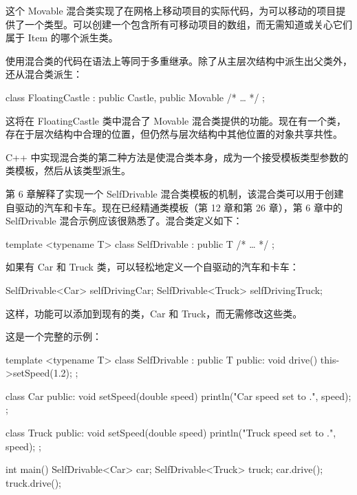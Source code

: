 这个 Movable 混合类实现了在网格上移动项目的实际代码，为可以移动的项目提供了一个类型。可以创建一个包含所有可移动项目的数组，而无需知道或关心它们属于 Item 的哪个派生类。


使用混合类的代码在语法上等同于多重继承。除了从主层次结构中派生出父类外，还从混合类派生：

\begin{cpp}
class FloatingCastle : public Castle, public Movable { /* … */ };
\end{cpp}

这将在 FloatingCastle 类中混合了 Movable 混合类提供的功能。现在有一个类，存在于层次结构中合理的位置，但仍然与层次结构中其他位置的对象共享共性。


C++ 中实现混合类的第二种方法是使混合类本身，成为一个接受模板类型参数的类模板，然后从该类型派生。

第 6 章解释了实现一个 SelfDrivable 混合类模板的机制，该混合类可以用于创建自驱动的汽车和卡车。现在已经精通类模板（第 12 章和第 26 章），第 6 章中的 SelfDrivable 混合示例应该很熟悉了。混合类定义如下：

\begin{cpp}
template <typename T>
class SelfDrivable : public T { /* … */ };
\end{cpp}

如果有 Car 和 Truck 类，可以轻松地定义一个自驱动的汽车和卡车：

\begin{cpp}
SelfDrivable<Car> selfDrivingCar;
SelfDrivable<Truck> selfDrivingTruck;
\end{cpp}

这样，功能可以添加到现有的类，Car 和 Truck，而无需修改这些类。

这是一个完整的示例：

\begin{cpp}
template <typename T>
class SelfDrivable : public T
{
    public:
        void drive() { this->setSpeed(1.2); }
};

class Car
{
    public:
        void setSpeed(double speed) { println("Car speed set to {}.", speed); }
};

class Truck
{
    public:
        void setSpeed(double speed) { println("Truck speed set to {}.", speed); }
};

int main()
{
    SelfDrivable<Car> car;
    SelfDrivable<Truck> truck;
    car.drive();
    truck.drive();
}
\end{cpp}


